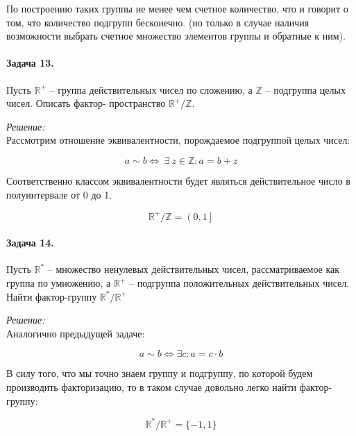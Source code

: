 \documentclass[10pt,a4paper]{article}
\begin{document}
	По построению таких группы не менее чем счетное количество, что и говорит 
	о том, что количество подгрупп бесконечно. (но только в случае наличия 
	возможности выбрать счетное множество элементов группы и обратные к ним).
	
	\paragraph{Задача 13.} Пусть $\mathbb{R}^{+}$ -- группа действительных чисел 
	по сложению, а $\mathbb{Z}$ -- подгруппа целых чисел. Описать фактор-
	пространство $\mathbb{R}^{+}/\mathbb{Z}$.
	
	\textit{Решение:}\\
	
	Рассмотрим отношение эквивалентности, порождаемое подгруппой целых чисел:
	
	\begin{equation}
		\label{eq:ex_13_eq_01}
		a \sim b \Leftrightarrow \ \exists \ z \in \mathbb{Z}: a = b + z
	\end{equation}
	
	Соответственно классом эквивалентности будет являться действительное число 
	в полуинтервале от 0 до 1.
	
	\begin{equation}
		\label{eq:ex_13_eq_02}
		\mathbb{R}^{+}/\mathbb{Z} = \left(0, 1\right]
	\end{equation}
	
	\paragraph{Задача 14.} Пусть $\mathbb{R}^{*}$ -- множество ненулевых 
	действительных чисел, рассматриваемое как группа по умножению, а 
	$\mathbb{R}^{+}$ -- подгруппа положительных действительных чисел. Найти 
	фактор-группу $\mathbb{R}^{*}/\mathbb{R}^{+}$
	
	\textit{Решение:}\\
	
	Аналогично предыдущей задаче:
	
	\begin{equation}
		\label{eq:ex_14_eq_01}
		a\sim b \Leftrightarrow \exists c: a = c\cdot b
	\end{equation}
	
	В силу того, что мы точно знаем группу и подгруппу, по которой будем 
	производить факторизацию, то в таком случае довольно легко найти фактор-
	группу:
	
	\begin{equation}
		\label{eq:ex_14_eq_02}
		\mathbb{R}^{*}/\mathbb{R}^{+} = \lbrace -1, 1\rbrace
	\end{equation}
	
\end{document}
